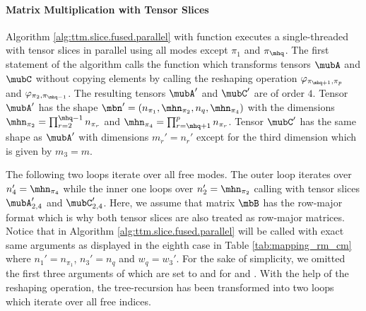 \paragraph{Matrix Multiplication with Tensor Slices}
Algorithm \ref{alg:ttm.slice.fused.parallel} with function \allowbreak{} executes a single-threaded  with tensor slices in parallel using all modes except $\pi_1$ and $\pi_{\mhq}$.
The first statement of the algorithm calls the  function which transforms tensors $\mubA$ and $\mubC$ without copying elements by calling the reshaping operation $\varphi_{\pi_{\mhq+1},\pi_p}$ and $\varphi_{\pi_{2},\pi_{\mhq-1}}$.
The resulting tensors $\mubA'$ and $\mubC'$ are of order $4$.
Tensor $\mubA'$ has the shape $\mbn'=(n_{\pi_1},\mhn_{\pi_2},n_{q}, \mhn_{\pi_4})$ with the dimensions $\mhn_{\pi_2} = \prod_{r=2}^{\mhq-1} n_{\pi_r}$ and $\mhn_{\pi_4} = \prod_{r=\mhq+1}^{p} n_{\pi_r}$.
Tensor $\mubC'$ has the same shape as $\mubA'$ with dimensions $m_r' = n_r'$ except for the third dimension which is given by $m_3=m$.

The following two  loops iterate over all free modes.
The outer loop iterates over $n_4' = \mhn_{\pi_4}$ while the inner one loops over $n_2' = \mhn_{\pi_2}$ calling  with tensor slices $\mubA_{2,4}'$ and $\mubC_{2,4}'$.
Here, we assume that matrix $\mbB$ has the row-major format which is why both tensor slices are also treated as row-major matrices.
Notice that  in Algorithm \ref{alg:ttm.slice.fused.parallel} will be called with exact same arguments as displayed in the eighth case in Table \ref{tab:mapping_rm_cm} where $n_{1}' = n_{\pi_1}$, $n_{3}' = n_q$ and $w_q = w_3'$. %
For the sake of simplicity, we omitted the first three arguments of  which are set to  and  for  and .
With the help of the reshaping operation, the tree-recursion has been transformed into two loops which iterate over all free indices.



